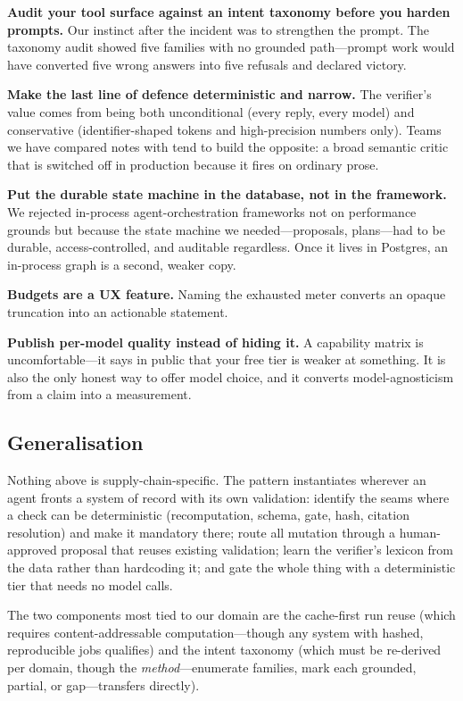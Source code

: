 \documentclass[conference]{IEEEtran}
\begin{document}
\textbf{Audit your tool surface against an intent taxonomy before you harden
prompts.} Our instinct after the incident was to strengthen the prompt. The
taxonomy audit showed five families with no grounded path---prompt work would
have converted five wrong answers into five refusals and declared victory.

\textbf{Make the last line of defence deterministic and narrow.} The verifier's
value comes from being both unconditional (every reply, every model) and
conservative (identifier-shaped tokens and high-precision numbers only). Teams we
have compared notes with tend to build the opposite: a broad semantic critic that
is switched off in production because it fires on ordinary prose.

\textbf{Put the durable state machine in the database, not in the framework.} We
rejected in-process agent-orchestration frameworks not on performance grounds but
because the state machine we needed---proposals, plans---had to be durable,
access-controlled, and auditable regardless. Once it lives in Postgres, an
in-process graph is a second, weaker copy.

\textbf{Budgets are a UX feature.} Naming the exhausted meter converts an opaque
truncation into an actionable statement.

\textbf{Publish per-model quality instead of hiding it.} A capability matrix is
uncomfortable---it says in public that your free tier is weaker at something. It
is also the only honest way to offer model choice, and it converts
model-agnosticism from a claim into a measurement.

\subsection{Generalisation}

Nothing above is supply-chain-specific. The pattern instantiates wherever an
agent fronts a system of record with its own validation: identify the seams where
a check can be deterministic (recomputation, schema, gate, hash, citation
resolution) and make it mandatory there; route all mutation through a
human-approved proposal that reuses existing validation; learn the verifier's
lexicon from the data rather than hardcoding it; and gate the whole thing with a
deterministic tier that needs no model calls.

The two components most tied to our domain are the cache-first run reuse (which
requires content-addressable computation---though any system with hashed,
reproducible jobs qualifies) and the intent taxonomy (which must be re-derived
per domain, though the \emph{method}---enumerate families, mark each grounded,
partial, or gap---transfers directly).
\end{document}
